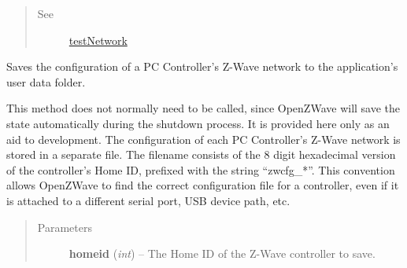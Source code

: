 \documentclass[letterpaper,10pt,english]{sphinxmanual}
\begin{document}
\begin{fulllineitems}
\begin{fulllineitems}
\begin{quote}
\begin{description}
\begin{itemize}
\end{itemize}

\item[{See}] \leavevmode
{\hyperref[libopenzwave:testnetwork]{testNetwork}}

\end{description}\end{quote}

\end{fulllineitems}


\begin{fulllineitems}
\label{libopenzwave:libopenzwave.PyManager.writeConfig}
Saves the configuration of a PC Controller's Z-Wave network to the
application's user data folder.

This method does not normally need to be called, since OpenZWave will save the
state automatically during the shutdown process.  It is provided here only as
an aid to development. The configuration of each PC Controller's Z-Wave network
is stored in a separate file.  The filename consists of the 8 digit hexadecimal
version of the controller's Home ID, prefixed with the string ``zwcfg\_*''.  This
convention allows OpenZWave to find the correct configuration file for a
controller, even if it is attached to a different serial port, USB device path,
etc.
\begin{quote}\begin{description}
\item[{Parameters}] \leavevmode
\textbf{homeid} (\emph{int}) -- The Home ID of the Z-Wave controller to save.

\end{description}\end{quote}

\end{fulllineitems}


\end{fulllineitems}

\end{document}
